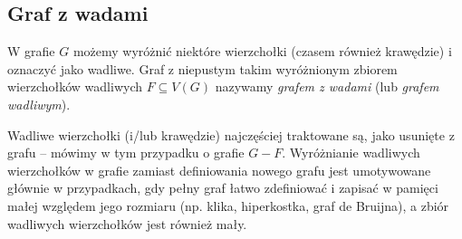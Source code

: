 \documentclass{pracamgr}
\begin{document}
   \subsection{Graf z wadami}
    W grafie $G$ możemy wyróżnić niektóre wierzchołki (czasem również krawędzie) i oznaczyć jako wadliwe.
    Graf z niepustym takim wyróżnionym zbiorem wierzchołków wadliwych $F\subseteq V(G)$ nazywamy \emph{grafem z wadami} (lub \emph{grafem wadliwym}).
    
    Wadliwe wierzchołki (i/lub krawędzie) najczęściej traktowane są, jako usunięte z grafu -- mówimy w tym przypadku o grafie $G-F$.
    Wyróżnianie wadliwych wierzchołków w grafie zamiast definiowania nowego grafu jest umotywowane głównie w przypadkach,
    gdy pełny graf łatwo zdefiniować i zapisać w pamięci małej względem jego rozmiaru (np. klika, hiperkostka, graf de Bruijna),
    a zbiór wadliwych wierzchołków jest również mały.
\end{document}
